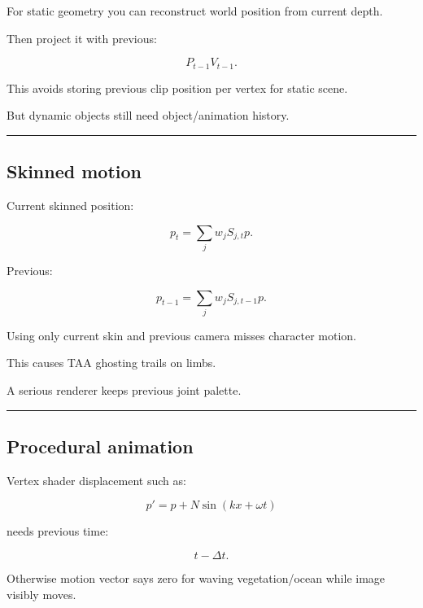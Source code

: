 \hypertarget{04-visual-computing-ii-ch040-camera-motion}{}

For static geometry you can reconstruct world position from current depth.

Then project it with previous:

\[
P_{t-1}V_{t-1}.
\]

This avoids storing previous clip position per vertex for static scene.

But dynamic objects still need object/animation history.

\begin{center}\rule{0.5\linewidth}{0.5pt}\end{center}

\subsection{Skinned motion}\label{04-visual-computing-ii-ch040-skinned-motion}

\hypertarget{04-visual-computing-ii-ch040-skinned-motion}{}

Current skinned position:

\[
p_t=
\sum_j
w_j
S_{j,t}p.
\]

Previous:

\[
p_{t-1}
=
\sum_j
w_j
S_{j,t-1}p.
\]

Using only current skin and previous camera misses character motion.

This causes TAA ghosting trails on limbs.

A serious renderer keeps previous joint palette.

\begin{center}\rule{0.5\linewidth}{0.5pt}\end{center}

\subsection{Procedural animation}\label{04-visual-computing-ii-ch040-procedural-animation}

\hypertarget{04-visual-computing-ii-ch040-procedural-animation}{}

Vertex shader displacement such as:

\[
p'=p+
N\sin(
kx+\omega t
)
\]

needs previous time:

\[
t-\Delta t.
\]

Otherwise motion vector says zero for waving vegetation/ocean while image visibly moves.

